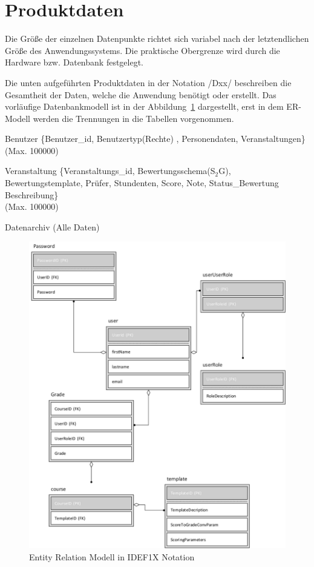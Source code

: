 	
	
	\section{Produktdaten}
	
		Die Größe der einzelnen Datenpunkte richtet sich variabel nach der letztendlichen Größe des Anwendungssystems. Die praktische Obergrenze wird durch die Hardware bzw. Datenbank festgelegt. 
		
		Die unten aufgeführten Produktdaten in der Notation /Dxx/ beschreiben die Gesamtheit der Daten, welche die Anwendung benötigt oder erstellt. Das vorläufige Datenbankmodell ist in der Abbildung~\ref{fig:ERM} dargestellt, erst in dem ER-Modell werden die Trennungen in die Tabellen vorgenommen. 
		
	\begin{description}
	\item[/D10/] Benutzer \{Benutzer\_id, Benutzertyp(Rechte) , Personendaten, Veranstaltungen\}\\ (Max. 100000) 
	\item[/D20/] Veranstaltung \{Veranstaltungs\_id, Bewertungsschema(S$_2$G), Bewertungstemplate, Prüfer, Stundenten, Score, Note, Status\_Bewertung\, Beschreibung\} \\ (Max. 100000)
	\item[/D30/] Datenarchiv (Alle Daten)
	\end{description}
	
	
	\begin{figure}
\centering
\includegraphics[width=\textwidth]{./img/ERM}
\caption{Entity Relation Modell in IDEF1X Notation}
\label{fig:ERM}
\end{figure}

